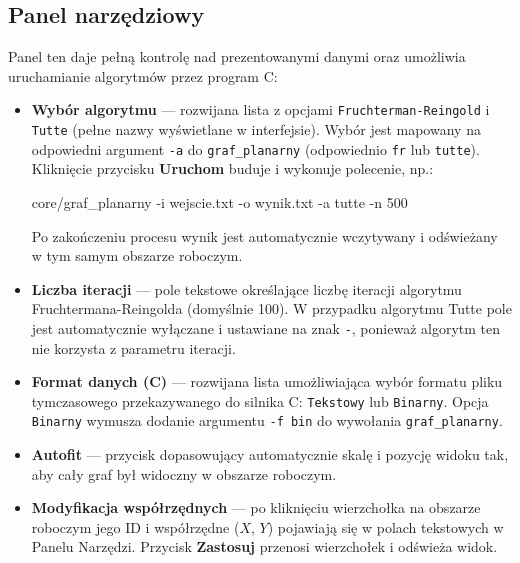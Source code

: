 \documentclass[a4paper, 11pt]{article}
\begin{document}
\subsection{Panel narz\k{e}dziowy}

Panel ten daje pe\l{}n\k{a} kontrol\k{e} nad prezentowanymi danymi oraz umo\.zliwia uruchamianie algorytm\'ow przez program C:

\begin{itemize}
    \item \textbf{Wyb\'or algorytmu} --- rozwijana lista z opcjami \texttt{Fruchterman-Reingold} i \texttt{Tutte} (pe\l{}ne nazwy wy\'swietlane w interfejsie). Wyb\'or jest mapowany na odpowiedni argument \texttt{-a} do \texttt{graf\_planarny} (odpowiednio \texttt{fr} lub \texttt{tutte}). Klikni\k{e}cie przycisku \textbf{Uruchom} buduje i wykonuje polecenie, np.:
  \begin{cmdbox}
core/graf\_planarny -i wejscie.txt -o wynik.txt -a tutte -n 500
  \end{cmdbox}
  Po zako\'nczeniu procesu wynik jest automatycznie wczytywany i od\'swie\.zany w tym samym obszarze roboczym.

  \item \textbf{Liczba iteracji} --- pole tekstowe okre\'slaj\k{a}ce liczb\k{e} iteracji algorytmu Fruchtermana-Reingolda (domy\'slnie 100). W przypadku algorytmu Tutte pole jest automatycznie wy\l{}\k{a}czane i ustawiane na znak \texttt{-}, poniewa\.z algorytm ten nie korzysta z parametru iteracji.

  \item \textbf{Format danych (C)} --- rozwijana lista umo\.zliwiaj\k{a}ca wyb\'or formatu pliku tymczasowego przekazywanego do silnika C: \texttt{Tekstowy} lub \texttt{Binarny}. Opcja \texttt{Binarny} wymusza dodanie argumentu \texttt{-f bin} do wywo\l{}ania \texttt{graf\_planarny}.

  \item \textbf{Autofit} --- przycisk dopasowuj\k{a}cy automatycznie skal\k{e} i pozycj\k{e} widoku tak, aby ca\l{}y graf by\l{} widoczny w obszarze roboczym.

  \item \textbf{Modyfikacja wsp\'o\l{}rz\k{e}dnych} --- po klikni\k{e}ciu wierzcho\l{}ka na obszarze roboczym jego ID i wsp\'o\l{}rz\k{e}dne ($X$, $Y$) pojawiaj\k{a} si\k{e} w polach tekstowych w Panelu Narz\k{e}dzi. Przycisk \textbf{Zastosuj} przenosi wierzcho\l{}ek i od\'swie\.za widok.


\end{itemize}
\end{document}
